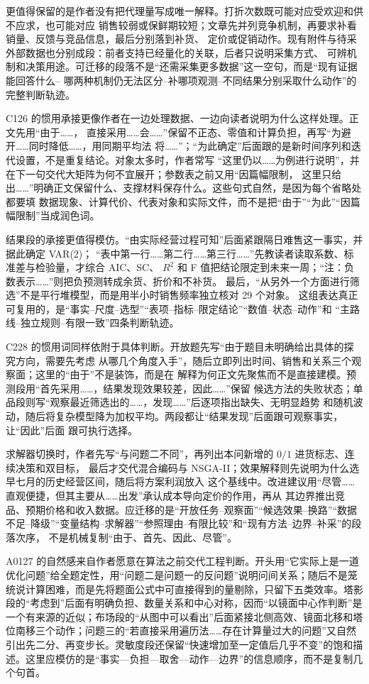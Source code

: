 更值得保留的是作者没有把代理量写成唯一解释。打折次数既可能对应受欢迎和供不应求，也可能对应
销售较弱或保鲜期较短；文章先并列竞争机制，再要求补看销量、反馈与竞品信息，最后分别落到补货、
定价或促销动作。现有附件与待采外部数据也分别成段：前者支持已经量化的关联，后者只说明采集方式、
可辨机制和决策用途。可迁移的段落不是“还需采集更多数据”这一空句，而是“现有证据能回答什么--
哪两种机制仍无法区分--补哪项观测--不同结果分别采取什么动作”的完整判断轨迹。

C126 的惯用承接更像作者在一边处理数据、一边向读者说明为什么这样处理。正文先用“由于……，
直接采用……会……”保留不正态、零值和计算负担，再写“为避开……同时降低……，用同期平均法
将……”；“为此确定”后面跟的是新时间序列和迭代设置，不是重复结论。对象太多时，作者常写
“这里仍以……为例进行说明”，并在下一句交代大矩阵为何不宜展开；参数表之前又用“因篇幅限制，
这里只给出……”明确正文保留什么、支撑材料保存什么。这些句式自然，是因为每个省略处都要填
数据现象、计算代价、代表对象和实际文件，而不是把“由于”“为此”“因篇幅限制”当成润色词。

结果段的承接更值得模仿。“由实际经营过程可知”后面紧跟隔日难售这一事实，并据此确定 VAR(2)；
“表中第一行……第二行……第三行……”先教读者读取系数、标准差与检验量，才综合 AIC、SC、
$R^2$ 和 F 值把结论限定到未来一周；“注：负数表示……”则把负预测转成余货、折价和不补货。
最后，“从另外一个方面进行筛选”不是平行堆模型，而是用半小时销售频率独立核对 29 个对象。
这组表达真正可复用的，是“事实--尺度--选型”“表项--指标--限定结论”“数值--状态--动作”和
“主路线--独立规则--有限一致”四条判断轨迹。

C228 的惯用词同样依附于具体判断。开放题先写“由于题目未明确给出具体的探究方向，需要先考虑
从哪几个角度入手”，随后立即列出时间、销售和关系三个观察面；这里的“由于”不是装饰，而是在
解释为何正文先聚焦而不是直接建模。预测段用“首先采用……，结果发现效果较差，因此……”保留
候选方法的失败状态；单品段则写“观察最近筛选出的……，发现……”后逐项指出缺失、无明显趋势
和随机波动，随后将复杂模型降为加权平均。两段都让“结果发现”后面跟可观察事实，让“因此”后面
跟可执行选择。

求解器切换时，作者先写“与问题二不同”，再列出本问新增的 $0/1$ 进货标志、连续决策和双目标，
最后才交代混合编码与 NSGA-II；效果解释则先说明为什么选早七月的历史经营区间，随后将方案利润放入
这个基线中。改进建议用“尽管……直观便捷，但其主要从……出发”承认成本导向定价的作用，再从
其边界推出竞品、预期价格和收入数据。应迁移的是“开放任务--观察面”“候选效果--换路”“数据
不足--降级”“变量结构--求解器”“参照理由--有限比较”和“现有方法--边界--补采”的段落次序，
不是机械复制“由于、首先、因此、尽管”。

A0127 的自然感来自作者愿意在算法之前交代工程判断。开头用“它实际上是一道优化问题”给全题定性，用“问题二是问题一的反问题”说明问间关系；随后不是笼统说计算困难，而是先将题面公式中可直接得到的量剔除，只留下五类效率。塔影段的“考虑到”后面有明确负担、数量关系和中心对称，因而“以镜面中心作判断”是一个有来源的近似；布场段的“从图中可以看出”后面紧接北侧高效、镜面北移和塔位南移三个动作；问题三的“若直接采用遍历法……存在计算量过大的问题”又自然引出先二分、再变步长。灵敏度段还保留“快速增加至一定值后几乎不变”的饱和描述。这里应模仿的是“事实—负担—取舍—动作—边界”的信息顺序，而不是复制几个句首。


